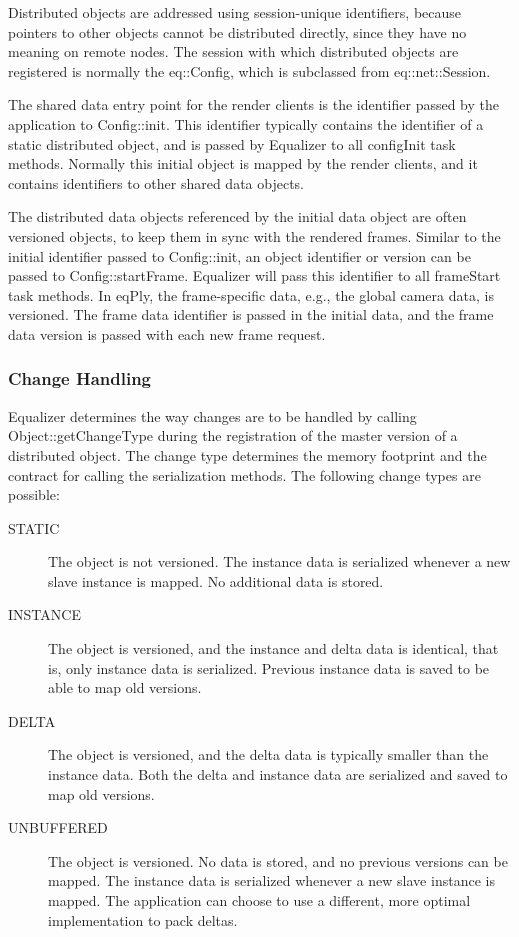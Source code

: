 \documentclass[10pt,a4]{scrartcl}
\begin{document}
Distributed objects are addressed using session-unique identifiers,
because pointers to other objects cannot be distributed directly, since
they have no meaning on remote nodes. The session with which distributed
objects are registered is normally the \textsf{eq::Config}, which is
subclassed from \textsf{eq::net::Session}.

The shared data entry point for the render clients is the identifier
passed by the application to \textsf{Config::init}. This identifier
typically contains the identifier of a static distributed object, and is
passed by Equalizer to all \textsf{configInit} task methods. Normally
this initial object is mapped by the render clients, and it contains
identifiers to other shared data objects.

The distributed data objects referenced by the initial data object are
often versioned objects, to keep them in sync with the rendered
frames. Similar to the initial identifier passed to
\textsf{Config::init}, an object identifier or version can be passed to
\textsf{Config::startFrame}. Equalizer will pass this identifier to all
\textsf{frameStart} task methods. In \textsf{eqPly}, the frame-specific
data, e.g., the global camera data, is versioned. The frame data
identifier is passed in the initial data, and the frame data version is
passed with each new frame request.

\subsubsection{Change Handling}

Equalizer determines the way changes are to be handled by calling
\textsf{Object::getChangeType} during the registration of the master
version of a distributed object. The change type determines the memory
footprint and the contract for calling the serialization methods. The
following change types are possible:

\begin{description}
  \item[STATIC] The object is not versioned. The instance data is
    serialized whenever a new slave instance is mapped. No additional
    data is stored.
  \item[INSTANCE] The object is versioned, and the instance and delta
    data is identical, that is, only instance data is
    serialized. Previous instance data is saved to be able to map old
    versions.
  \item[DELTA] The object is versioned, and the delta data is typically
    smaller than the instance data. Both the delta and instance data are
    serialized and saved to map old versions.
  \item[UNBUFFERED] The object is versioned. No data is stored, and no
    previous versions can be mapped. The instance data is serialized
    whenever a new slave instance is mapped. The application can choose
    to use a different, more optimal implementation to pack deltas.
\end{description}
\end{document}
